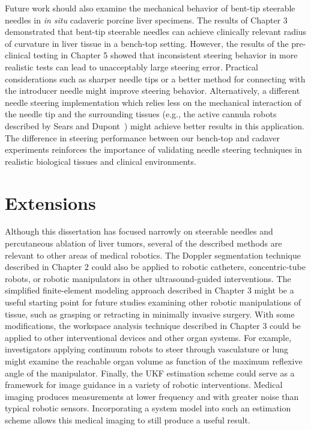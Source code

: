 Future work should also examine the mechanical behavior of bent-tip steerable needles in \textit{in situ} cadaveric porcine liver specimens. The results of Chapter 3 demonstrated that bent-tip steerable needles can achieve clinically relevant radius of curvature in liver tissue in a bench-top setting. However, the results of the pre-clinical testing in Chapter 5 showed that inconsistent steering behavior in more realistic tests can lead to unacceptably large steering error. Practical considerations such as sharper needle tips or a better method for connecting with the introducer needle might improve steering behavior. Alternatively, a different needle steering implementation which relies less on the mechanical interaction of the needle tip and the surrounding tissues (e.g., the active cannula robots described by Sears and Dupont~\cite{Sears2006}) might achieve better results in this application. The difference in steering performance between our bench-top and cadaver experiments reinforces the importance of validating needle steering techniques in realistic biological tissues and clinical environments. 

\section{Extensions}
Although this dissertation has focused narrowly on steerable needles and percutaneous ablation of liver tumors, several of the described methods are relevant to other areas of medical robotics. The Doppler segmentation technique described in Chapter 2 could also be applied to robotic catheters, concentric-tube robots, or robotic manipulators in other ultrasound-guided interventions. The simplified finite-element modeling approach described in Chapter 3 might be a useful starting point for future studies examining other robotic manipulations of tissue, such as grasping or retracting in minimally invasive surgery. With some modifications, the workspace analysis technique described in Chapter 3 could be applied to other interventional devices and other organ systems. For example, investigators applying continuum robots to steer through vasculature or lung might examine the reachable organ volume as function of the maximum reflexive angle of the manipulator. Finally, the UKF estimation scheme could serve as a framework for image guidance in a variety of robotic interventions. Medical imaging produces measurements at lower frequency and with greater noise than typical robotic sensors. Incorporating a system model into such an estimation scheme allows this medical imaging to still produce a useful result.




